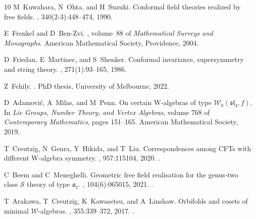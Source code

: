 \documentclass[10pt,a4paper]{amsart}
\numberwithin{equation}{section}
\theoremstyle{plain}
\begin{document}
\begin{thebibliography}{10}
M~Kuwahara, N~Ohta, and H~Suzuki.
\newblock Conformal field theories realized by free fields.
, 340(2-3):448--474, 1990.

E~Frenkel and D~Ben-Zvi.
, volume~88 of {\em
  Mathematical Surveys and Monographs}.
\newblock American Mathematical Society, Providence, 2004.

D~Friedan, E~Martinec, and S~Shenker.
\newblock Conformal invariance, supersymmetry and string theory.
, 271(1):93--165, 1986.

Z~Fehily.
.
\newblock PhD thesis, University of Melbourne, 2022.

D~Adamovi\'c, A~Milas, and M~Penn.
\newblock On certain {W}-algebras of type $\mathcal{W}_k(\mathfrak{sl}_4,f)$.
\newblock In {\em Lie Groups, Number Theory, and Vertex Algebras}, volume 768
  of {\em Contemporary Mathematics}, pages 151--165. American Mathematical
  Society, 2019.

T~Creutzig, N~Genra, Y~Hikida, and T~Liu.
\newblock Correspondences among {CFT}s with different {W}-algebra symmetry.
, 957:115104, 2020.
\newblock {}.

C~Beem and C~Meneghelli.
\newblock Geometric free field realisation for the genus-two class
  $\mathcal{S}$ theory of type $\mathfrak{a}_1$.
, 104(6):065015, 2021.
\newblock {}.

T~Arakawa, T~Creutzig, K~Kawasetsu, and A~Linshaw.
\newblock Orbifolds and cosets of minimal {$\mathcal{W}$}-algebras.
, 355:339--372, 2017.
\newblock {}.

\end{thebibliography}
\end{document}

